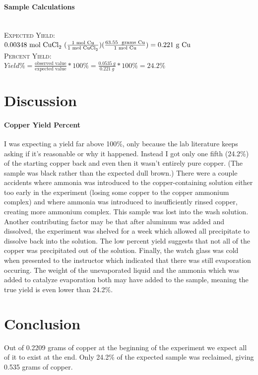 \documentclass[11pt,letterpaper]{report}
\begin{document}
\paragraph{Sample Calculations}\mbox{}\\
\textsc{Expected Yield:} \\
$0.00348 \text{ mol \ce{CuCl2} } ( \frac{\text{1 mol \ce{Cu}}}{\text{1 mol \ce{CuCl2}}} ) ( \frac{\text{63.55 \text{ grams} \ce{Cu}}}{\text{1 mol \ce{Cu}}} ) = 0.221 \text{ g \ce{Cu}}$\\
\textsc{Percent Yield:} \\
$Yield \% = \frac{\text{observed value}}{\text{expected value}} * 100\% = \frac{0.0535\ g}{0.221\ g} * 100\% = 24.2\%$

\section*{Discussion}
\paragraph{Copper Yield Percent}
I was expecting a yield far above 100\%, only because the lab literature keeps asking if it's reasonable or why it happened. Instead I got only one fifth  (24.2\%) of the starting copper back and even then it wasn't entirely pure copper. (The sample was black rather than the expected dull brown.) There were a couple accidents where ammonia was introduced to the copper-containing solution either too early in the experiment (losing some copper to the copper ammonium complex) and where ammonia was introduced to insufficiently rinsed copper, creating more ammonium complex. This sample was lost into the wash solution. Another contributing factor may be that after aluminum was added and dissolved, the experiment was shelved for a week which allowed all precipitate to dissolve back into the solution. The low percent yield suggests that not all of the copper was precipitated out of the solution. Finally, the watch glass was cold when presented to the instructor which indicated that there was still evaporation occuring. The weight of the unevaporated liquid and the ammonia which was added to catalyze evaporation both may have added to the sample, meaning the true yield is even lower than 24.2\%.

\section*{Conclusion}
Out of 0.2209 grams of copper at the beginning of the experiment we expect all of it to exist at the end. Only 24.2\% of the expected sample was reclaimed, giving 0.535 grams of copper.
\end{document}
